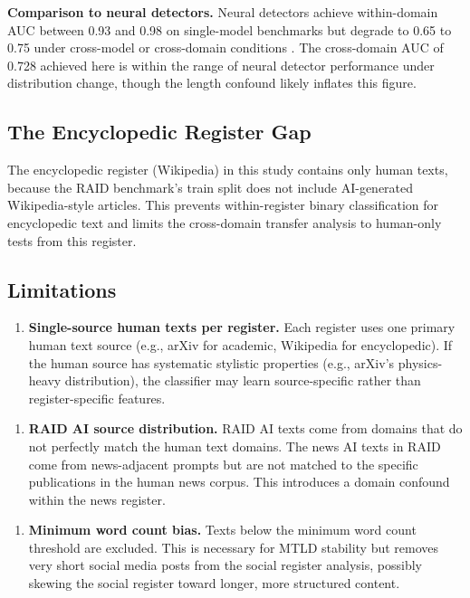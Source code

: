 \documentclass{article}
\begin{document}
\textbf{Comparison to neural detectors.} Neural detectors achieve within-domain AUC between 0.93 and 0.98 on single-model benchmarks but degrade to 0.65 to 0.75 under cross-model or cross-domain conditions \cite{ref1,ref4}. The cross-domain AUC of 0.728 achieved here is within the range of neural detector performance under distribution change, though the length confound likely inflates this figure.

\subsection{The Encyclopedic Register Gap}

The encyclopedic register (Wikipedia) in this study contains only human texts, because the RAID benchmark's train split does not include AI-generated Wikipedia-style articles. This prevents within-register binary classification for encyclopedic text and limits the cross-domain transfer analysis to human-only tests from this register.

\subsection{Limitations}

\begin{enumerate}
  \item \textbf{Single-source human texts per register.} Each register uses one primary human text source (e.g., arXiv for academic, Wikipedia for encyclopedic). If the human source has systematic stylistic properties (e.g., arXiv's physics-heavy distribution), the classifier may learn source-specific rather than register-specific features.
\end{enumerate}

\begin{enumerate}
  \item \textbf{RAID AI source distribution.} RAID AI texts come from domains that do not perfectly match the human text domains. The news AI texts in RAID come from news-adjacent prompts but are not matched to the specific publications in the human news corpus. This introduces a domain confound within the news register.
\end{enumerate}

\begin{enumerate}
  \item \textbf{Minimum word count bias.} Texts below the minimum word count threshold are excluded. This is necessary for MTLD stability but removes very short social media posts from the social register analysis, possibly skewing the social register toward longer, more structured content.
\end{enumerate}
\end{document}
